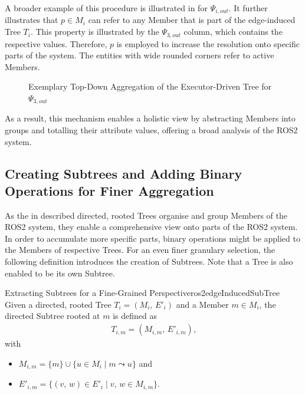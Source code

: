     A broader example of this procedure is illustrated in  for $\Psi_{i,out}$. It further illustrates that $p\in M_i$ can refer to any Member that is part of the edge-induced Tree $T_i$. This property is illustrated by the $\Psi_{3,out}$ column, which contains the respective values. Therefore, $p$ is employed to increase the resolution onto specific parts of the system.\newline    
    The entities with wide rounded corners refer to active Members.
    \begin{figure}[h!]
        \centering
        
        \caption[Exemplary Top-Down Aggregation]{Exemplary Top-Down Aggregation of the Executor-Driven Tree for $\Psi_{3,out}$ \legendadapted} \label{fig:tikz:mathModel:topDownExample}
    \end{figure}

    As a result, this mechanism enables a holistic view by abstracting Members into groups and totalling their attribute values, offering a broad analysis of the ROS2 system.


    \subsection[Creating Subtrees and Adding Binary Operations]{Creating Subtrees and Adding Binary Operations for Finer Aggregation} \label{subsec:mathModel:binaryAggregation}
    As the in  described directed, rooted Trees organise and group Members of the ROS2 system, they enable a comprehensive view onto parts of the ROS2 system. In order to accumulate more specific parts, binary operations might be applied to the Members of respective Trees. For an even finer granulary selection, the following definition introduces the creation of Subtrees. Note that a Tree is also enabled to be its own Subtree.
\clearpage

    \begin{definitionbox}{Extracting Subtrees for a Fine-Grained Perspective}{ros2edgeInducedSubTree}
        Given a directed, rooted Tree $T_i = (M_i,\,E'_i)$ and a Member $m\in M_i$, the directed Subtree rooted at $m$ is defined as
        \vspace{-.25cm}
        \begin{align*}
            T_{i,m} = (M_{i,m},\,E'_{i,m})\text{,}
        \end{align*}\vspace{-.25cm}
        with
        \begin{itemize}[label=$\circ$]
            \item $M_{i,m} = \{ m \} \cup \{ u \in M_i \mid m \leadsto u \}$ and
            \item $E'_{i,m} = \{ (v,\,w) \in E'_i \mid v,\,w \in M_{i,m} \}$.
        \end{itemize}
    \end{definitionbox}

